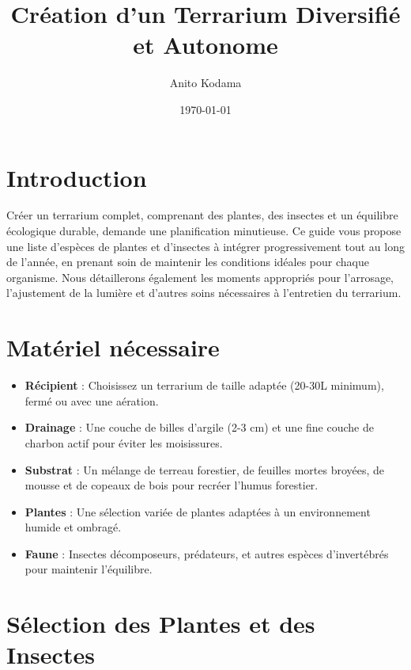 
\usepackage[utf8]{inputenc}
\usepackage{enumitem}

\title{Création d'un Terrarium Diversifié et Autonome}
\author{Anito Kodama}
\date{\today}



\maketitle

\section*{Introduction}
Créer un terrarium complet, comprenant des plantes, des insectes et un équilibre écologique durable, demande une planification minutieuse. Ce guide vous propose une liste d'espèces de plantes et d'insectes à intégrer progressivement tout au long de l'année, en prenant soin de maintenir les conditions idéales pour chaque organisme. Nous détaillerons également les moments appropriés pour l'arrosage, l'ajustement de la lumière et d'autres soins nécessaires à l'entretien du terrarium.

\section*{Matériel nécessaire}
\begin{itemize}
    \item \textbf{Récipient} : Choisissez un terrarium de taille adaptée (20-30L minimum), fermé ou avec une aération.
    \item \textbf{Drainage} : Une couche de billes d'argile (2-3 cm) et une fine couche de charbon actif pour éviter les moisissures.
    \item \textbf{Substrat} : Un mélange de terreau forestier, de feuilles mortes broyées, de mousse et de copeaux de bois pour recréer l'humus forestier.
    \item \textbf{Plantes} : Une sélection variée de plantes adaptées à un environnement humide et ombragé.
    \item \textbf{Faune} : Insectes décomposeurs, prédateurs, et autres espèces d'invertébrés pour maintenir l'équilibre.
\end{itemize}

\section*{Sélection des Plantes et des Insectes}

